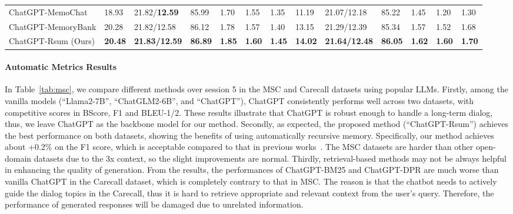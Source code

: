 \documentclass[authoryear,preprint,review,12pt]{elsarticle}
\begin{document}
\begin{table}[t]
{\begin{tabular}{lllllllllllll}
ChatGPT-MemoChat                  & 18.93          & 21.82/\textbf{12.59}          & 85.99          & 1.70          & 1.55          & 1.35          & 11.19          & 21.07/12.18          & 85.22          & 1.45          & 1.20          & 1.30          \\
ChatGPT-MemoryBank                & 20.28          & 21.82/12.58          & 86.12          & 1.78          & 1.57          & 1.40          & 13.15          & 21.29/12.39          & 85.34          & 1.57          & 1.52          & 1.68          \\
ChatGPT-Rsum (Ours)                & \textbf{20.48} & \textbf{21.83/12.59} & \textbf{86.89} & \textbf{1.85} & \textbf{1.60} & \textbf{1.45} & \textbf{14.02} & \textbf{21.64/12.48} & \textbf{86.05} & \textbf{1.62} & \textbf{1.60} & \textbf{1.70}\\
\bottomrule
\end{tabular}
}

\end{table}
\paragraph*{Automatic Metrics Results} In Table~\ref{tab:msc}, we compare different methods over session 5 in the MSC and Carecall datasets using popular LLMs. Firstly, among the vanilla models (``Llama2-7B'', ``ChatGLM2-6B'', and ``ChatGPT''), ChatGPT consistently performs well across two datasets, with competitive scores in BScore, F1 and BLEU-1/2. 
These results illustrate that ChatGPT is robust enough to handle a long-term dialog, thus, we leave ChatGPT as the backbone model for our method.
Secondly, as expected, the proposed method (``ChatGPT-Rsum'') achieves the best performance on both datasets, showing the benefits of using automatically recursive memory. Specifically, our method achieves about +0.2\% on the F1 score, which is acceptable compared to that in previous works~\citep{xu-etal-2022-beyond}. The MSC datasets are harder than other open-domain datasets due to the 3x context, so the slight improvements are normal. 
Thirdly, retrieval-based methods may not be always helpful in enhancing the quality of generation. From the results, the performances of ChatGPT-BM25 and ChatGPT-DPR are much worse than vanilla ChatGPT in the Carecall dataset, which is completely contrary to that in MSC. The reason is that the chatbot needs to actively guide the dialog topics in the Carecall, thus it is hard to retrieve appropriate and relevant context from the user's query. Therefore, the performance of generated responses will be damaged due to unrelated information.
\end{document}
